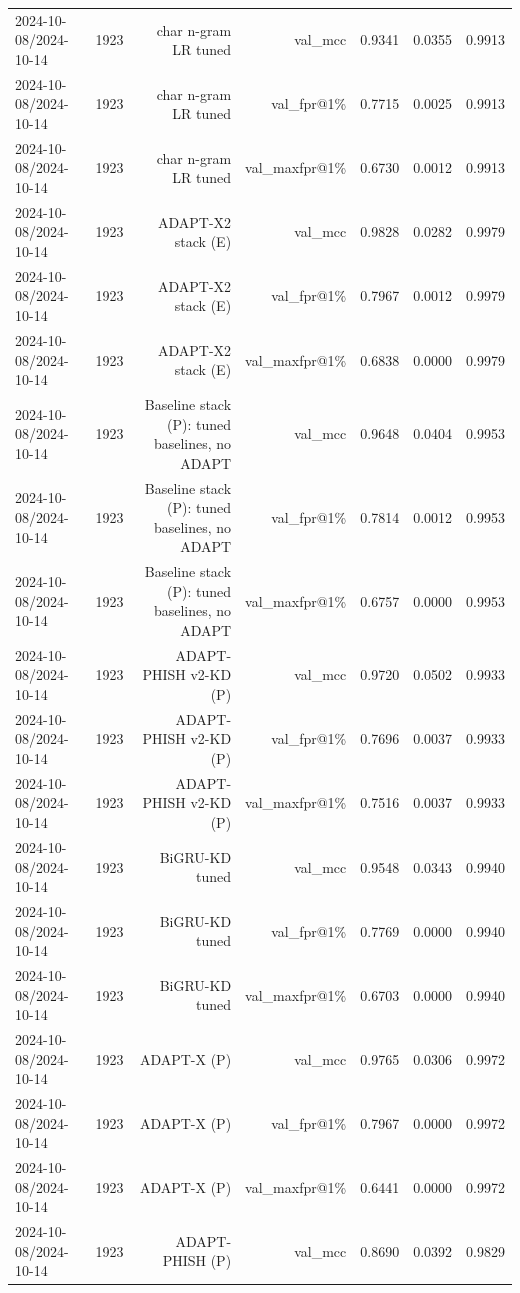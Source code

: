 \begin{table}[t]
\begin{tabular}{llrrrrr}
2024-10-08/2024-10-14 & 1923 & char n-gram LR tuned & val\_mcc & 0.9341 & 0.0355 & 0.9913 \\
2024-10-08/2024-10-14 & 1923 & char n-gram LR tuned & val\_fpr@1\% & 0.7715 & 0.0025 & 0.9913 \\
2024-10-08/2024-10-14 & 1923 & char n-gram LR tuned & val\_maxfpr@1\% & 0.6730 & 0.0012 & 0.9913 \\
2024-10-08/2024-10-14 & 1923 & ADAPT-X2 stack (E) & val\_mcc & 0.9828 & 0.0282 & 0.9979 \\
2024-10-08/2024-10-14 & 1923 & ADAPT-X2 stack (E) & val\_fpr@1\% & 0.7967 & 0.0012 & 0.9979 \\
2024-10-08/2024-10-14 & 1923 & ADAPT-X2 stack (E) & val\_maxfpr@1\% & 0.6838 & 0.0000 & 0.9979 \\
2024-10-08/2024-10-14 & 1923 & Baseline stack (P): tuned baselines, no ADAPT & val\_mcc & 0.9648 & 0.0404 & 0.9953 \\
2024-10-08/2024-10-14 & 1923 & Baseline stack (P): tuned baselines, no ADAPT & val\_fpr@1\% & 0.7814 & 0.0012 & 0.9953 \\
2024-10-08/2024-10-14 & 1923 & Baseline stack (P): tuned baselines, no ADAPT & val\_maxfpr@1\% & 0.6757 & 0.0000 & 0.9953 \\
2024-10-08/2024-10-14 & 1923 & ADAPT-PHISH v2-KD (P) & val\_mcc & 0.9720 & 0.0502 & 0.9933 \\
2024-10-08/2024-10-14 & 1923 & ADAPT-PHISH v2-KD (P) & val\_fpr@1\% & 0.7696 & 0.0037 & 0.9933 \\
2024-10-08/2024-10-14 & 1923 & ADAPT-PHISH v2-KD (P) & val\_maxfpr@1\% & 0.7516 & 0.0037 & 0.9933 \\
2024-10-08/2024-10-14 & 1923 & BiGRU-KD tuned & val\_mcc & 0.9548 & 0.0343 & 0.9940 \\
2024-10-08/2024-10-14 & 1923 & BiGRU-KD tuned & val\_fpr@1\% & 0.7769 & 0.0000 & 0.9940 \\
2024-10-08/2024-10-14 & 1923 & BiGRU-KD tuned & val\_maxfpr@1\% & 0.6703 & 0.0000 & 0.9940 \\
2024-10-08/2024-10-14 & 1923 & ADAPT-X (P) & val\_mcc & 0.9765 & 0.0306 & 0.9972 \\
2024-10-08/2024-10-14 & 1923 & ADAPT-X (P) & val\_fpr@1\% & 0.7967 & 0.0000 & 0.9972 \\
2024-10-08/2024-10-14 & 1923 & ADAPT-X (P) & val\_maxfpr@1\% & 0.6441 & 0.0000 & 0.9972 \\
2024-10-08/2024-10-14 & 1923 & ADAPT-PHISH (P) & val\_mcc & 0.8690 & 0.0392 & 0.9829 \\

\end{tabular}
\end{table}

